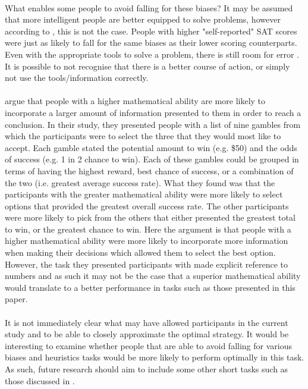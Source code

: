 \documentclass[12pt]{article}
\begin{document}
\paragraph{} What enables some people to avoid falling for these biases? It may be assumed that more intelligent people are better equipped to solve problems, however according to \cite{stanovich2008relative}, this is not the case. People with higher "self-reported" SAT scores were just as likely to fall for the same biases as their lower scoring counterparts. Even with the appropriate tools to solve a problem, there is still room for error \citep{KAHNEMAN1982}. It is possible to not recognise that there is a better course of action, or simply not use the tools/information correctly.  

\paragraph{} \cite{jasper2017numeracy} argue that people with a higher mathematical ability are more likely to incorporate a larger amount of information presented to them in order to reach a conclusion. In their study, they presented people with a list of nine gambles from which the participants were to select the three that they would most like to accept. Each gamble stated the potential amount to win (e.g. \$50) and the odds of success (e.g. 1 in 2 chance to win). Each of these gambles could be grouped in terms of having the highest reward, best chance of success, or a combination of the two (i.e. greatest average success rate). What they found was that the participants with the greater mathematical ability were more likely to select options that provided the greatest overall success rate. The other participants were more likely to pick from the others that either presented the greatest total to win, or the greatest chance to win. Here the argument is that people with a higher mathematical ability were more likely to incorporate more information when making their decisions which allowed them to select the best option. However, the task they presented participants with made explicit reference to numbers and as such it may not be the case that a superior mathematical ability would translate to a better performance in tasks such as those presented in this paper. 
  
\paragraph{} It is not immediately clear what may have allowed participants in the current study and \cite{clarke2015failure} to be able to closely approximate the optimal strategy. It would be interesting to examine whether people that are able to avoid falling for various biases and heuristics tasks would be more likely to perform optimally in this task. As such, future research should aim to include some other short tasks such as those discussed in \cite{Toplak2011}. 
\end{document}
